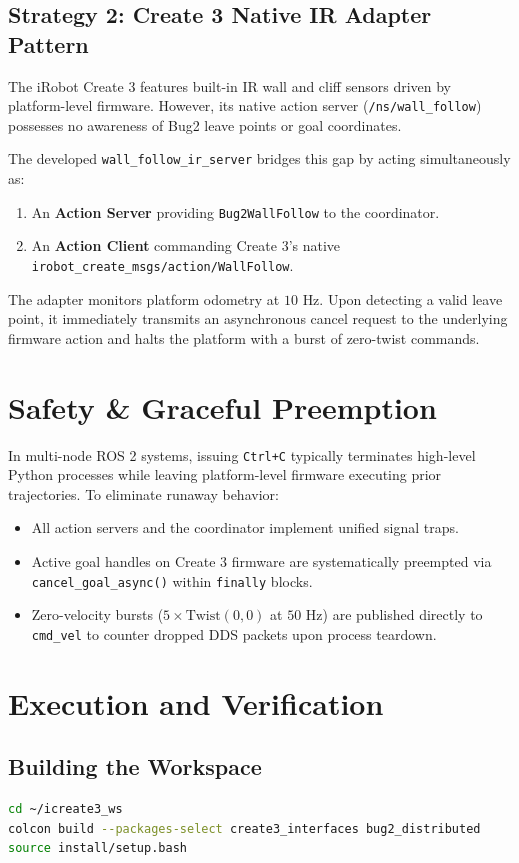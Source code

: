 \documentclass[11pt,a4paper]{article}
\begin{document}
\subsection{Strategy 2: Create 3 Native IR Adapter Pattern}
The iRobot Create 3 features built-in IR wall and cliff sensors driven by platform-level firmware. However, its native action server (\texttt{/{ns}/wall\_follow}) possesses no awareness of Bug2 leave points or goal coordinates. 

The developed \texttt{wall\_follow\_ir\_server} bridges this gap by acting simultaneously as:
\begin{enumerate}
    \item An \textbf{Action Server} providing \texttt{Bug2WallFollow} to the coordinator.
    \item An \textbf{Action Client} commanding Create 3's native \texttt{irobot_create_msgs/action/WallFollow}.
\end{enumerate}
The adapter monitors platform odometry at $10\text{ Hz}$. Upon detecting a valid leave point, it immediately transmits an asynchronous cancel request to the underlying firmware action and halts the platform with a burst of zero-twist commands.

\section{Safety \& Graceful Preemption}
In multi-node ROS 2 systems, issuing \texttt{Ctrl+C} typically terminates high-level Python processes while leaving platform-level firmware executing prior trajectories. To eliminate runaway behavior:
\begin{itemize}
    \item All action servers and the coordinator implement unified signal traps.
    \item Active goal handles on Create 3 firmware are systematically preempted via \texttt{cancel\_goal\_async()} within \texttt{finally} blocks.
    \item Zero-velocity bursts ($5 \times \text{Twist}(0, 0)$ at $50\text{ Hz}$) are published directly to \texttt{cmd\_vel} to counter dropped DDS packets upon process teardown.
\end{itemize}

\section{Execution and Verification}

\subsection{Building the Workspace}
\begin{lstlisting}[language=bash]
cd ~/icreate3_ws
colcon build --packages-select create3_interfaces bug2_distributed
source install/setup.bash
\end{lstlisting}
\end{document}
